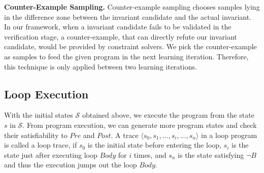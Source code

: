 \medskip\noindent
\textbf{Counter-Example Sampling.}
Counter-example sampling chooses samples lying in the difference zone between the invariant candidate and the actual invariant.
In our framework, when a invariant candidate fails to be validated in the verification stage,
a counter-example, that can directly refute our invariant candidate, would be provided by constraint solvers.
We pick the counter-example as samples to feed the given program in the next learning iteration.
Therefore, this technique is only applied between two learning iterations.



\subsection {Loop Execution}
With the initial states $\mathcal{S}$ obtained above, 
we execute the program from the state $s$ in $\mathcal{S}$. 
From program execution, 
we can generate more program states and check their satisfiability to $Pre$ and $Post$.
A trace $\langle s_0, s_1, ..., s_i, ..., s_n\rangle$ in a loop program is called a loop trace, 
if $s_0$ is the initial state before entering the loop, 
$s_i$ is the state just after executing loop $Body$ for $i$ times,
and $s_n$ is the state satisfying $\neg B$ and thus the execution jumps out the loop $Body$.

